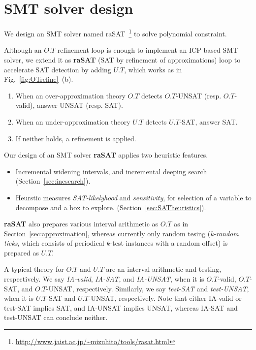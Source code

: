 \chapter{SMT solver design}
We design an SMT solver named raSAT~\footnote{\url{http://www.jaist.ac.jp/~mizuhito/tools/rasat.html}} to solve polynomial constraint. 

Although an $O.T$ refinement loop is enough to implement an ICP based SMT solver, 
we extend it as {\bf raSAT} (SAT by refinement of approximations) loop to accelerate SAT detection 
by adding $U.T$, which works as in Fig.~\ref{fig:OTrefine}~(b). 
\begin{enumerate}
\item When an over-approximation theory $O.T$ detects $O.T$-UNSAT (resp. $O.T$-valid), 
answer UNSAT (resp. SAT). 
\item When an under-approximation theory $U.T$ detects $U.T$-SAT, answer SAT. 
\item If neither holds, a refinement is applied. 
\end{enumerate}

Our design of an SMT solver {\bf raSAT} applies two heuristic features. 
\begin{itemize}
\item Incremental widening intervals, and incremental deeping search 
(Section~\ref{sec:incsearch}). 
\item 
Heurstic measures {\em SAT-likelyhood} and {\em sensitivity}, 
for selection of a variable to decompose and a box to explore. 
(Section~\ref{sec:SATheuristics}). 
\end{itemize} 

{\bf raSAT} also prepares various interval arithmetic as $O.T$ as in Section~\ref{sec:approximation}, 
whereas currently only random tesing (\emph{k-random ticks}, 
which consists of periodical $k$-test instances with a random offset) is prepared as $U.T$. 

A typical theory for $O.T$ and $U.T$ are an interval arithmetic and testing, respectively. 
We say {\em IA-valid}, {\em IA-SAT}, and {\em IA-UNSAT}, when it is $O.T$-valid, $O.T$-SAT, and 
$O.T$-UNSAT, respectively. 
Similarly, we say {\em test-SAT} and {\em test-UNSAT}, when it is $U.T$-SAT and $U.T$-UNSAT, respectively. 
Note that either IA-valid or test-SAT implies SAT, and IA-UNSAT implies UNSAT, 
whereas IA-SAT and test-UNSAT can conclude neither. 


